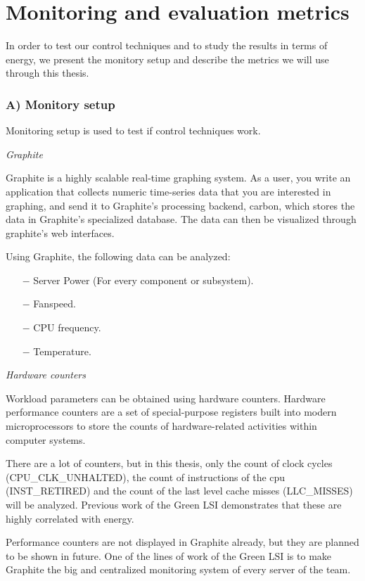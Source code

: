 \section{Monitoring and evaluation metrics}

In order to test our control techniques and to study the results in terms of energy, we present the monitory setup and describe the metrics we will use through this thesis.

\subsubsection{A) Monitory setup}

Monitoring setup is used to test if control techniques work.

\emph{Graphite}

Graphite is a highly scalable real-time graphing system. As a user, you write an application that collects numeric time-series data that you are interested in graphing, and send it to Graphite's processing backend, carbon, which stores the data in Graphite's specialized database. The data can then be visualized through graphite's web interfaces. 

Using Graphite, the following data can be analyzed:

\begin{itemize}
    \item[$-$] Server Power (For every component or subsystem).
    \item[$-$] Fanspeed.
    \item[$-$] CPU frequency.
    \item[$-$] Temperature.

\end{itemize}

\emph{Hardware counters}

Workload parameters can be obtained using hardware counters. Hardware performance counters are a set of special-purpose registers built into modern microprocessors to store the counts of hardware-related activities within computer systems.

There are a lot of counters, but in this thesis, only the count of clock cycles (CPU\_CLK\_UNHALTED), the count of instructions of the cpu (INST\_RETIRED) and the count of the last level cache misses (LLC\_MISSES) will be analyzed. Previous work of the Green LSI demonstrates that these are highly correlated with energy.

Performance counters are not displayed in Graphite already, but they are planned to be shown in future. One of the lines of work of the Green LSI is to make Graphite the big  and centralized monitoring system of every server of the team.



